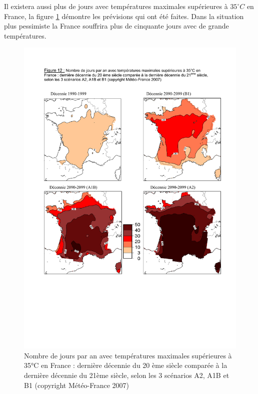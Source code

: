 \documentclass[a4paper,11pt]{article}
\begin{document}
Il  existera aussi  plus  de  jours avec  températures  maximales supérieures  à
$35^{\circ}C$ en  France, la  figure \ref{fig:35france} démontre  les prévisions
qui ont été  faites. Dans la situation plus pessimiste  la France souffrira plus
de cinquante jours avec de grande températures. 

\begin{figure}[H]
  \begin{centering}
    \includegraphics[scale=0.5]{fig/35france}
    \par\end{centering}
  \caption{Nombre de jours par an avec températures maximales supérieures à 35°C
    en  France :  dernière décennie  du  20 ème  siècle comparée  à la  dernière
    décennie du  21ème siècle, selon  les 3 scénarios  A2, A1B et  B1 (copyright
    Météo-France 2007)}

  \label{fig:35france}
\end{figure}
\end{document}
